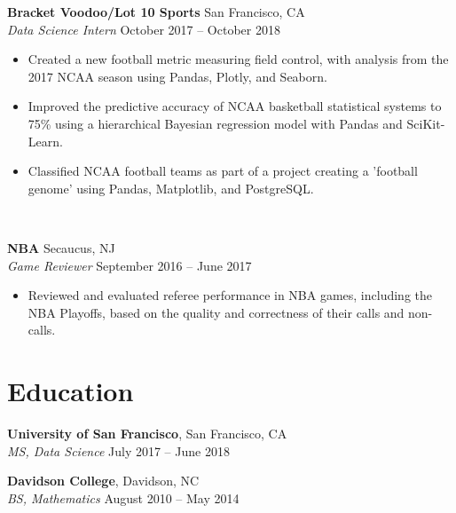 \documentclass[line, margin]{res}
\begin{document}
\begin{resume}
	\textbf{Bracket Voodoo/Lot 10 Sports} \hfill{San Francisco, CA} \vspace{1mm}\\\vspace{0.5mm}%
	\textsl{Data Science Intern} \hfill {October 2017 -- October 2018}\
	\begin{itemize}
		\item Created a new football metric measuring field control, with analysis from the 2017 NCAA season using Pandas, Plotly, and Seaborn.
		\item Improved the predictive accuracy of NCAA basketball statistical systems to 75\% using a hierarchical Bayesian regression model with Pandas and SciKit-Learn.
		\item Classified NCAA football teams as part of a project creating a 'football genome' using Pandas, Matplotlib, and PostgreSQL.
	\end{itemize}\

	\textbf{NBA} \hfill{Secaucus, NJ} \vspace{1mm}\\\vspace{0.5mm}%
	\textsl{Game Reviewer} \hfill {September 2016 -- June 2017}\
	\begin{itemize}
		\item Reviewed and evaluated referee performance in NBA games, including the NBA Playoffs, based on the quality and correctness of their calls and non-calls.
	\end{itemize}
	
	
\section{Education}
	\textbf{University of San Francisco}, San Francisco, CA \vspace{1mm}\\\vspace{1mm}
	\textsl{MS, Data Science} \hfill {July 2017 -- June 2018}\

	\textbf{Davidson College}, Davidson, NC \vspace{1mm}\\\vspace{-1mm}
	\textsl{BS, Mathematics} \hfill {August 2010 -- May 2014}



\end{resume}
\end{document}
